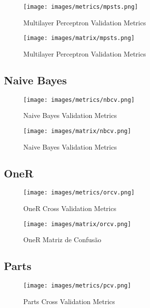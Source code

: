 \begin{figure}[H]
  \centering
  \texttt{[image: images/metrics/mpsts.png]}
  \caption{Multilayer Perceptron Validation Metrics}
  \label{fig:mp_cv_metrics}
\end{figure}

\begin{figure}[H]
  \centering
  \texttt{[image: images/matrix/mpsts.png]}
  \caption{Multilayer Perceptron Validation Metrics}
  \label{fig:mp_cv_matrix}
\end{figure}

\subsection{Naive Bayes}

\begin{figure}[H]
  \centering
  \texttt{[image: images/metrics/nbcv.png]}
  \caption{Naive Bayes Validation Metrics}
  \label{fig:nb_cv_metrics}
\end{figure}

\begin{figure}[H]
  \centering
  \texttt{[image: images/matrix/nbcv.png]}
  \caption{Naive Bayes Validation Metrics}
  \label{fig:nb_cv_matrix}
\end{figure}

\subsection{OneR}

\begin{figure}[H]
  \centering
  \texttt{[image: images/metrics/orcv.png]}
  \caption{OneR Cross Validation Metrics}
  \label{fig:or_cv_metrics}
\end{figure}

\begin{figure}[H]
  \centering
  \texttt{[image: images/matrix/orcv.png]}
  \caption{OneR Matriz de Confusão}
  \label{fig:or_cv_matrix}
\end{figure}

\subsection{Parts}

\begin{figure}[H]
  \centering
  \texttt{[image: images/metrics/pcv.png]}
  \caption{Parts Cross Validation Metrics}
  \label{fig:p_cv_metrics}
\end{figure}

